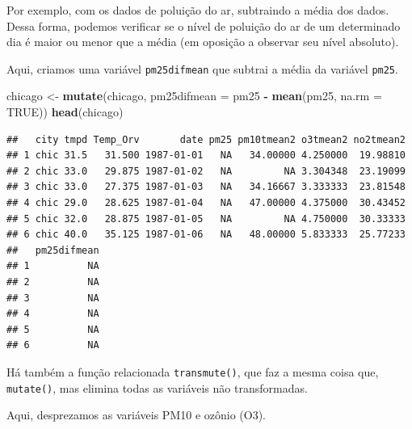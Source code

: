 \documentclass[]{book}
\newenvironment{Shaded}{\begin{snugshade}}{\end{snugshade}}
\newcommand{\DataTypeTok}[1]{\textcolor[rgb]{0.13,0.29,0.53}{#1}}
\newcommand{\KeywordTok}[1]{\textcolor[rgb]{0.13,0.29,0.53}{\textbf{#1}}}
\newcommand{\NormalTok}[1]{#1}
\newcommand{\OperatorTok}[1]{\textcolor[rgb]{0.81,0.36,0.00}{\textbf{#1}}}
\newcommand{\OtherTok}[1]{\textcolor[rgb]{0.56,0.35,0.01}{#1}}
\newcommand{\StringTok}[1]{\textcolor[rgb]{0.31,0.60,0.02}{#1}}
\begin{document}
Por exemplo, com os dados de poluição do ar, subtraindo a média dos dados. Dessa forma, podemos verificar se o nível de poluição do ar de um determinado dia é maior ou menor que a média (em oposição a observar seu nível absoluto).

Aqui, criamos uma variável \texttt{pm25difmean} que subtrai a média da variável \texttt{pm25}.

\begin{Shaded}
\begin{Highlighting}[]
\NormalTok{chicago <-}\StringTok{ }\KeywordTok{mutate}\NormalTok{(chicago, }\DataTypeTok{pm25difmean =}\NormalTok{ pm25 }\OperatorTok{-}\StringTok{ }\KeywordTok{mean}\NormalTok{(pm25, }\DataTypeTok{na.rm =} \OtherTok{TRUE}\NormalTok{))}
\KeywordTok{head}\NormalTok{(chicago)}
\end{Highlighting}
\end{Shaded}

\begin{verbatim}
##   city tmpd Temp_Orv       date pm25 pm10tmean2 o3tmean2 no2tmean2
## 1 chic 31.5   31.500 1987-01-01   NA   34.00000 4.250000  19.98810
## 2 chic 33.0   29.875 1987-01-02   NA         NA 3.304348  23.19099
## 3 chic 33.0   27.375 1987-01-03   NA   34.16667 3.333333  23.81548
## 4 chic 29.0   28.625 1987-01-04   NA   47.00000 4.375000  30.43452
## 5 chic 32.0   28.875 1987-01-05   NA         NA 4.750000  30.33333
## 6 chic 40.0   35.125 1987-01-06   NA   48.00000 5.833333  25.77233
##   pm25difmean
## 1          NA
## 2          NA
## 3          NA
## 4          NA
## 5          NA
## 6          NA
\end{verbatim}

Há também a função relacionada \texttt{transmute()}, que faz a mesma coisa que, \texttt{mutate()}, mas elimina todas as variáveis não transformadas.

Aqui, desprezamos as variáveis PM10 e ozônio (O3).

\begin{Shaded}
\end{Shaded}
\end{document}
